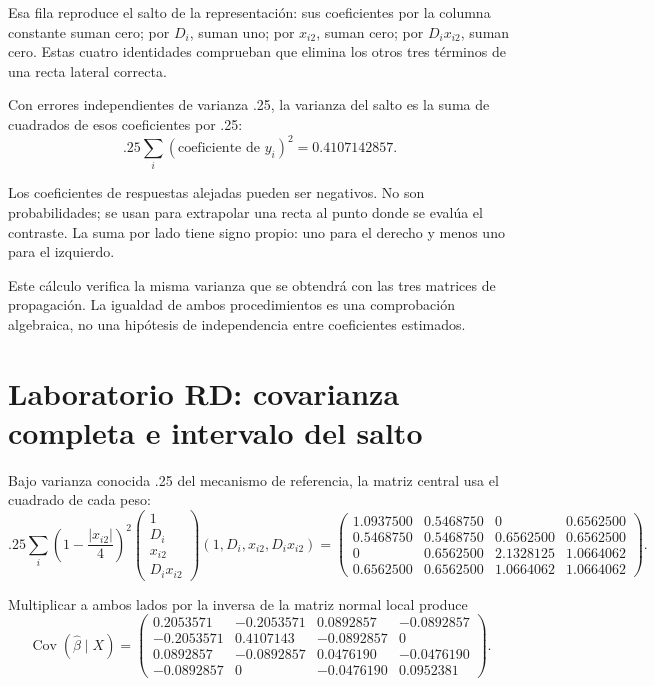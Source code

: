 \documentclass[11pt,a4paper]{article}
\DeclareMathOperator{\Cov}{Cov}
\begin{document}
Esa fila reproduce el salto de la representación:
sus coeficientes por la columna constante suman cero;
por \(D_i\), suman uno;
por \(x_{i2}\), suman cero;
por \(D_ix_{i2}\), suman cero.
Estas cuatro identidades comprueban que elimina
los otros tres términos de una recta lateral correcta.

Con errores independientes de varianza .25,
la varianza del salto es la suma
de cuadrados de esos coeficientes por .25:
\[
.25\sum_i(\text{coeficiente de }y_i)^2=0.4107142857.
\]

Los coeficientes de respuestas alejadas
pueden ser negativos. No son probabilidades;
se usan para extrapolar una recta
al punto donde se evalúa el contraste.
La suma por lado tiene signo propio:
uno para el derecho y menos uno
para el izquierdo.

Este cálculo verifica la misma varianza
que se obtendrá con las tres matrices
de propagación. La igualdad de ambos
procedimientos es una comprobación algebraica,
no una hipótesis de independencia
entre coeficientes estimados.

\clearpage
\section{Laboratorio RD: covarianza completa e intervalo del salto}\label{unidad55}
Bajo varianza conocida .25 del mecanismo de referencia,
la matriz central usa el cuadrado de cada peso:
\[
.25\sum_i\left(1-\frac{|x_{i2}|}{4}\right)^2
\begin{pmatrix}1\\D_i\\x_{i2}\\D_ix_{i2}\end{pmatrix}
(1,D_i,x_{i2},D_ix_{i2})
=\begin{pmatrix}1.0937500&0.5468750&0&0.6562500\\0.5468750&0.5468750&0.6562500&0.6562500\\0&0.6562500&2.1328125&1.0664062\\0.6562500&0.6562500&1.0664062&1.0664062\end{pmatrix}.
\]

Multiplicar a ambos lados por la inversa
de la matriz normal local produce
\[
\Cov(\widehat\beta\mid X)=\begin{pmatrix}0.2053571&-0.2053571&0.0892857&-0.0892857\\-0.2053571&0.4107143&-0.0892857&0\\0.0892857&-0.0892857&0.0476190&-0.0476190\\-0.0892857&0&-0.0476190&0.0952381\end{pmatrix}.
\]
\end{document}
